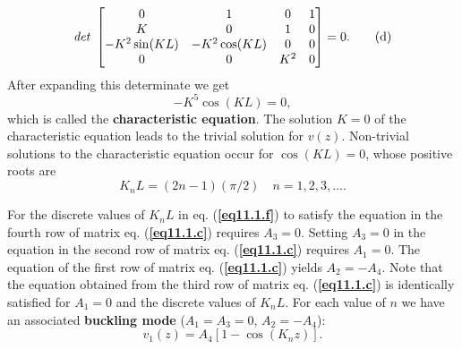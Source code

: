 \documentclass{AeroStructure-ERJohnson}
\begin{document}
\begin{example}
\begin{equation}
\textit{det }\left[\begin{array}{@{}cccc@{}} 0 & 1 & 0 & 1 \\ K & 0 & 1 & 0 \\ -K^{2} \sin (K L) & -K^{2} \cos (K L) & 0 & 0 \\ 0 & 0 & K^{2} & 0 \end{array}\right]=0. \label{eq11.1.d}\tag{d}
\end{equation}
After expanding this determinate we get
\begin{equation}
 -K^{5} \cos (K L)=0 , \label{eq11.1.e}\tag{e}
\end{equation}
which is called the \textbf{characteristic equation}. The solution $ K=0 $ of the characteristic equation leads to the trivial solution for $ v(z) $. Non-trivial solutions to the characteristic equation occur for $\cos(KL)=0$, whose positive roots are
\begin{equation}
 K_{n} L=(2 n-1)(\pi/2) \quad n=1,2,3, \ldots. \label{eq11.1.f}\tag{f}
\end{equation}

For the discrete values of $K_{n} L$ in eq. (\textbf{\ref{eq11.1.f}}) to satisfy the equation in the fourth row of matrix eq. (\textbf{\ref{eq11.1.c}}) requires $ A_{3}=0 $. Setting $ A_{3}=0 $ in the equation in the second row of matrix eq. (\textbf{\ref{eq11.1.c}}) requires $ A_{1}=0 $. The equation of the first row of matrix eq. (\textbf{\ref{eq11.1.c}}) yields $ A_{2}=-A_{4}$. Note that the equation obtained from the third row of matrix eq. (\textbf{\ref{eq11.1.c}}) is identically satisfied for $ A_{1}=0 $ and the discrete values of $ K_{n} L $. For each value of $n$ we have an associated \textbf{buckling mode} ($A_1 = A_3 = 0$, $A_{{2}} = -A_4$):
\begin{equation}
 v_{1}(z)=A_{4}\left[1-\cos \left(K_{n} z\right)\right]. \label{eq11.1.g}\tag{g}
\end{equation}

\removelastskip


\end{example}
\end{document}

